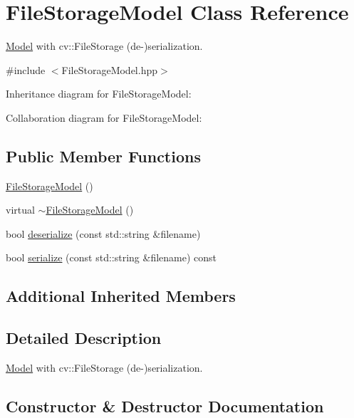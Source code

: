 \hypertarget{classFileStorageModel}{}\section{File\+Storage\+Model Class Reference}
\label{classFileStorageModel}


\hyperlink{classModel}{Model} with cv\+::\+File\+Storage (de-\/)serialization.  




{\ttfamily \#include $<$File\+Storage\+Model.\+hpp$>$}



Inheritance diagram for File\+Storage\+Model\+:


Collaboration diagram for File\+Storage\+Model\+:
\subsection*{Public Member Functions}
\begin{DoxyCompactItemize}
\item 
\hyperlink{classFileStorageModel_a4a9563fed1ae1a659466d64ee8890653}{File\+Storage\+Model} ()
\item 
virtual \hyperlink{classFileStorageModel_aba448d7c91c33e63cdfc95c8580fd834}{$\sim$\+File\+Storage\+Model} ()
\item 
bool \hyperlink{classFileStorageModel_af97e8cf0ced06893ffca6ec119a31143}{deserialize} (const std\+::string \&filename)
\item 
bool \hyperlink{classFileStorageModel_acc945cf6792663f84f1302e926dca63d}{serialize} (const std\+::string \&filename) const 
\end{DoxyCompactItemize}
\subsection*{Additional Inherited Members}


\subsection{Detailed Description}
\hyperlink{classModel}{Model} with cv\+::\+File\+Storage (de-\/)serialization. 

\subsection{Constructor \& Destructor Documentation}
\hypertarget{classFileStorageModel_a4a9563fed1ae1a659466d64ee8890653}{}
